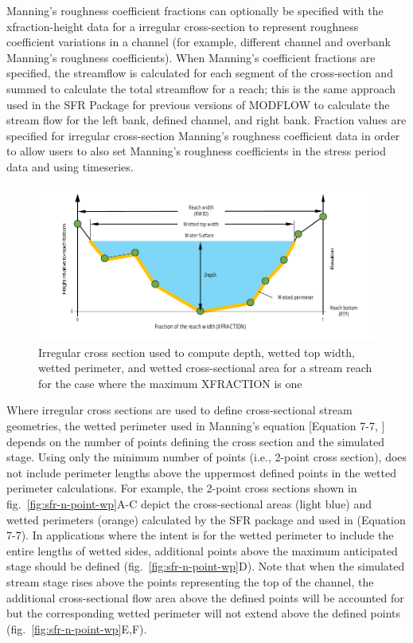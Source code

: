 Manning's roughness coefficient fractions can optionally be specified with the xfraction-height data for a irregular cross-section to represent roughness coefficient variations in a channel (for example, different channel and overbank Manning's roughness coefficients). When Manning's coefficient fractions are specified, the streamflow is calculated for each segment of the cross-section and summed to calculate the total streamflow for a reach; this is the same approach used in the SFR Package for previous versions of MODFLOW \citep{modflowsfr1pack} to calculate the stream flow for the left bank, defined channel, and right bank. Fraction values are specified for irregular cross-section Manning's roughness coefficient data in order to allow users to also set Manning's roughness coefficients in the stress period data and using timeseries.


\begin{figure}[ht]
	\centering
	\includegraphics[scale=1.0]{../Figures/n-point-cross-section}
	\caption[Illustration of a irregular cross section used to compute depth, wetted top width, wetted perimeter, and wetted cross-sectional area for a stream reach]{Irregular cross section used to compute depth, wetted top width, wetted perimeter, and wetted cross-sectional area for a stream reach for the case where the maximum XFRACTION is one}
	\label{fig:sfr-n-point}
\end{figure}

Where irregular cross sections are used to define cross-sectional stream geometries, the wetted perimeter used in Manning’s equation [Equation 7-7, \cite{modflow6gwf}] depends on the number of points defining the cross section and the simulated stage.  Using only the minimum number of points (i.e., 2-point cross section), \mf does not include perimeter lengths above the uppermost defined points in the wetted perimeter calculations. For example, the 2-point cross sections shown in fig.~\ref{fig:sfr-n-point-wp}A-C depict the cross-sectional areas (light blue) and wetted perimeters (orange) calculated by the SFR package and used in \cite{modflow6gwf} (Equation 7-7).  In applications where the intent is for the wetted perimeter to include the entire lengths of wetted sides, additional points above the maximum anticipated stage should be defined (fig.~\ref{fig:sfr-n-point-wp}D).  Note that when the simulated stream stage rises above the points representing the top of the channel, the additional cross-sectional flow area above the defined points will be accounted for but the corresponding wetted perimeter will not extend above the defined points (fig.~\ref{fig:sfr-n-point-wp}E,F).


